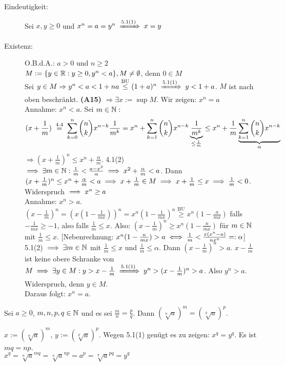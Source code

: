 \documentclass[a4paper,oneside,DIV15,BCOR12mm]{scrbook}
\begin{document}
\begin{beweis}
\begin{description}
\item[Eindeutigkeit:] Sei $x,y\ge0$ und $x^{n}=a=y^{n}\folgtwegen{5.1(1)} x=y$
\item[Existenz:] O.B.d.A.: $a>0$ und $n\ge2$\\
$M:=\{y\in\mathbb{R}:y\ge0, y^{n}<a\}, M\ne\emptyset$, denn $0\in M$\\
Sei $y\in M\Rightarrow y^{n}<a<1+na\stackrel{\text{BU}}{\le}(1+a)^{n} \folgtwegen{5.1(1)} y<1+a$. $M$ ist nach oben beschränkt. \textbf{(A15)} $\Rightarrow \exists x:=\sup{M}$. Wir zeigen: $x^{n}=a$\\
Annahme: $x^{n}<a$. Sei $m\in\mathbb{N}:$ \[(x+\frac{1}{m})\gleichwegen{4.4}\sum_{k=0}^{n}\binom{n}{k}x^{n-k}\frac{1}{m^{k}}=x^{n}+\sum_{k=1}^{n}\binom{n}{k}x^{n-k}\underbrace{\frac{1}{m^{k}}}_{\le\frac{1}{m}}\le x^{n}+\frac{1}{m}\underbrace{\sum_{k=1}^{n}\binom{n}{k}x^{n-k}}_{\alpha}\]
$\Rightarrow(x+\frac{1}{m})^{n}\le x^{n}+\frac{\alpha}{m}$. 4.1(2) $\implies \exists m \in \mathbb{N}: \frac{1}{m} < \frac{a-x^2}{\alpha} \implies x^2 + \frac{\alpha}m < a$. Dann $(x+\frac{1}m)^n \le x^n + \frac{\alpha}{m} < a \implies x + \frac{1}{m} \in M \implies x+\frac{1}{m} \le x \implies \frac{1}{m} <0 $. Widerspruch $\implies x^n \ge a$ \\
Annahme: $x^n>a$. $(x-\frac{1}{m})^n = (x(1-\frac{1}{mx}))^n = x^n(1-\frac{1}{mx})^n \stackrel{\text{BU}}{\ge} x^n(1-\frac{n}{mx})$ falls $-\frac{1}{mx} \ge -1$, also falls $\frac{1}{m} \le x $. Also: $(x-\frac{1}{m})^n \ge x^n(1-\frac{n}{mx})$ für $m\in\mathbb{N}$ mit $\frac{1}{m} \le x$. [Nebenrechnung: $x^n(1-\frac{n}{mx}) > a \iff \frac{1}{m} < \frac{x(x^n-a)}{nx^n} =: \alpha$] 5.1(2) $\implies \exists m\in\mathbb{N}$ mit $\frac{1}{m} \le x$ und $\frac{1}{m} \le \alpha$. Dann $(x-\frac{1}{m})^n > a$. $x-\frac{1}{m}$ ist keine obere Schranke von $M \folgt \exists y \in M: y> x - \frac{1}{m} \folgtnach{5.1(1)} y^n > (x-\frac{1}{m})^n >a$. Also $y^n>a$. Widerspruch, denn $y\in M$.\\
Daraus folgt: $x^n = a$.
\end{description}
\end{beweis}

\begin{satz}
Sei $a\ge 0$, $m,n,p,q \in \mathbb{N}$ und es sei $\frac{m}{n} = \frac{p}{q}$. Dann $(\sqrt[n]{a})^m = (\sqrt[q]{a})^p$.
\end{satz}

\begin{beweis}
$ x := (\sqrt[n]{a})^m$, $y:=(\sqrt[q]{a})^p$. Wegen 5.1(1) genügt es zu zeigen: $x^q = y^q$. Es ist $mq = np$. \\
$x^q = \sqrt[n]{a}^{mq} = \sqrt[n]{a}^{np} = a^p = \sqrt[q]{a}^{pq} = y^q$
\end{beweis}
\end{document}
